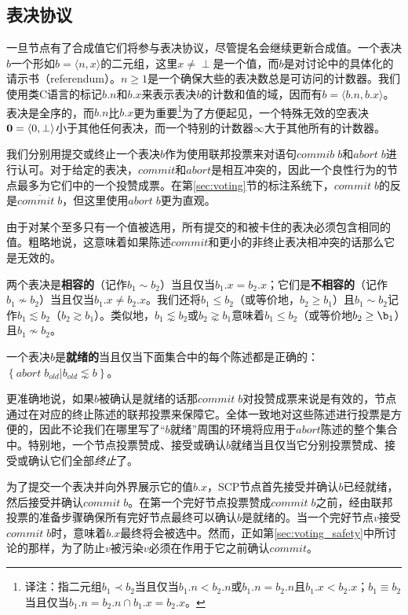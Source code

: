 \subsection{表决协议}
一旦节点有了合成值它们将参与表决协议，尽管提名会继续更新合成值。一个表决$b$一个形如$b=\langle n,x\rangle$的二元组，这里$x\neq \perp$是一个值，而$b$是对讨论中的{\slot}具体化的请示书（referendum）。$n\geq 1$是一个确保大些的表决数总是可访问的计数器。我们使用类C语言的标记$b.n$和$b.x$来表示表决$b$的计数和值的域，因而有$b=\langle b.n, b.x\rangle$。表决是全序的，而$b.n$比$b.x$更为重要{\footnote{译注：指二元组$b_1\prec b_2$当且仅当$b_1.n < b_2.n$或$b_1.n=b_2.n $且$b_1.x < b_2.x$；$b_1\equiv b_2$当且仅当$b_1.n=b_2.n\cap b_1.x=b_2.x$。}}为了方便起见，一个特殊无效的空表决${\bm 0}=\langle 0,\perp\rangle$小于其他任何表决，而一个特别的计数器$\infty$大于其他所有的计数器。

我们分别用提交或终止一个表决$b$作为使用联邦投票来对语句$commib\;b$和$abort\;b$进行认可。对于给定的表决，$commit$和$abort$是相互冲突的，因此一个良性行为的节点最多为它们中的一个投赞成票。在第\ref{sec:voting}节的标注系统下，$commit\;b$的反是$\overline{commit\;b}$，但这里使用$abort\;b$更为直观。

由于对某个{\slot}至多只有一个值被选用，所有提交的和被卡住的表决必须包含相同的值。粗略地说，这意味着如果陈述$commit$和更小的非终止表决相冲突的话那么它是无效的。

\begin{definition}[相容的]
        两个表决是\textbf{相容的}（记作$b_1 \sim b_2$）当且仅当$b_1.x=b_2.x$；它们是\textbf{不相容的}（记作$b_1\not\sim b_2$）当且仅当$b_1.x\neq b_2.x$。我们还将$b_1\leq b_2$（或等价地，$b_2\geq b_1$）且$b_1\sim b_2$记作$b_1\lesssim b_2$（$b_2\gtrsim b_1$）。类似地，$b_1\lnsim b_2$或$b_2\gnsim b_1$意味着$b_1\leq b_2$（或等价地$b_2\geq \b_1$）且$b_1\not\sim b_2$。
\end{definition}

\begin{definition}[就绪的]
        一个表决$b$是\textbf{就绪的}当且仅当下面集合中的每个陈述都是正确的：$\left\{abort\;b_{old}|b_{old}\lnsim b\right\}$。
\end{definition}

更准确地说，如果$b$被确认是就绪的话那$commit\;b$对投赞成票来说是有效的，节点通过在对应的终止陈述的联邦投票来保障它。全体一致地对这些陈述进行投票是方便的，因此不论我们在哪里写了``$b$就绪''周围的环境将应用于$abort$陈述的整个集合中。特别地，一个节点投票赞成、接受或确认$b$就绪当且仅当它分别投票赞成、接受或确认它们全部\textit{终止}了。

为了提交一个表决并向外界展示它的值$b.x$，SCP节点首先接受并确认$b$已经就绪，然后接受并确认$commit\;b$。在第一个完好节点投票赞成$commit\;b$之前，经由联邦投票的准备步骤确保所有完好节点最终可以确认$b$是就绪的。当一个完好节点$v$接受$commit\;b$时，意味着$b.x$最终将会被选中。然而，正如第\ref{sec:voting_safety}中所讨论的那样，为了防止$v$被污染$v$必须在作用于它之前确认$commit$。


